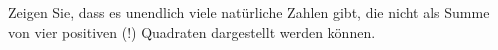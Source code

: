 
\begin{exercise}

Zeigen Sie, dass es unendlich viele natürliche Zahlen gibt, die nicht
als Summe von vier positiven (!) Quadraten dargestellt werden können.

\end{exercise}


\begin{solution}

\phantom{}

\end{solution}


